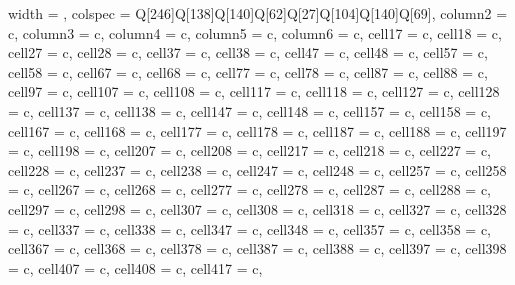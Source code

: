 \begin{longtblr}[
    caption = {\textbf{Summary of the inoculation tests on grapevine varieties
                ranked from most to less susceptible in the disease index.}
            Thirty-six local,
            regional and international varieties were screened in combination
            with eight
            rootstocks. The number of symptomatic leaves was counted 16 weeks
            after
            inoculation and infections were confirmed by qPCR. DI: disease
            index; AUDCP:
            area under the disease progress curve.},
    label = {tableS1},
    ]{
    width = \linewidth,
    colspec = {Q[246]Q[138]Q[140]Q[62]Q[27]Q[104]Q[140]Q[69]},
    column{2} = {c},
    column{3} = {c},
    column{4} = {c},
    column{5} = {c},
    column{6} = {c},
    cell{1}{7} = {c},
    cell{1}{8} = {c},
    cell{2}{7} = {c},
    cell{2}{8} = {c},
    cell{3}{7} = {c},
    cell{3}{8} = {c},
    cell{4}{7} = {c},
    cell{4}{8} = {c},
    cell{5}{7} = {c},
    cell{5}{8} = {c},
    cell{6}{7} = {c},
    cell{6}{8} = {c},
    cell{7}{7} = {c},
    cell{7}{8} = {c},
    cell{8}{7} = {c},
    cell{8}{8} = {c},
    cell{9}{7} = {c},
    cell{10}{7} = {c},
    cell{10}{8} = {c},
    cell{11}{7} = {c},
    cell{11}{8} = {c},
    cell{12}{7} = {c},
    cell{12}{8} = {c},
    cell{13}{7} = {c},
    cell{13}{8} = {c},
    cell{14}{7} = {c},
    cell{14}{8} = {c},
    cell{15}{7} = {c},
    cell{15}{8} = {c},
    cell{16}{7} = {c},
    cell{16}{8} = {c},
    cell{17}{7} = {c},
    cell{17}{8} = {c},
    cell{18}{7} = {c},
    cell{18}{8} = {c},
    cell{19}{7} = {c},
    cell{19}{8} = {c},
    cell{20}{7} = {c},
    cell{20}{8} = {c},
    cell{21}{7} = {c},
    cell{21}{8} = {c},
    cell{22}{7} = {c},
    cell{22}{8} = {c},
    cell{23}{7} = {c},
    cell{23}{8} = {c},
    cell{24}{7} = {c},
    cell{24}{8} = {c},
    cell{25}{7} = {c},
    cell{25}{8} = {c},
    cell{26}{7} = {c},
    cell{26}{8} = {c},
    cell{27}{7} = {c},
    cell{27}{8} = {c},
    cell{28}{7} = {c},
    cell{28}{8} = {c},
    cell{29}{7} = {c},
    cell{29}{8} = {c},
    cell{30}{7} = {c},
    cell{30}{8} = {c},
    cell{31}{8} = {c},
    cell{32}{7} = {c},
    cell{32}{8} = {c},
    cell{33}{7} = {c},
    cell{33}{8} = {c},
    cell{34}{7} = {c},
    cell{34}{8} = {c},
    cell{35}{7} = {c},
    cell{35}{8} = {c},
    cell{36}{7} = {c},
    cell{36}{8} = {c},
    cell{37}{8} = {c},
    cell{38}{7} = {c},
    cell{38}{8} = {c},
    cell{39}{7} = {c},
    cell{39}{8} = {c},
    cell{40}{7} = {c},
    cell{40}{8} = {c},
    cell{41}{7} = {c},
}
\end{longtblr}
